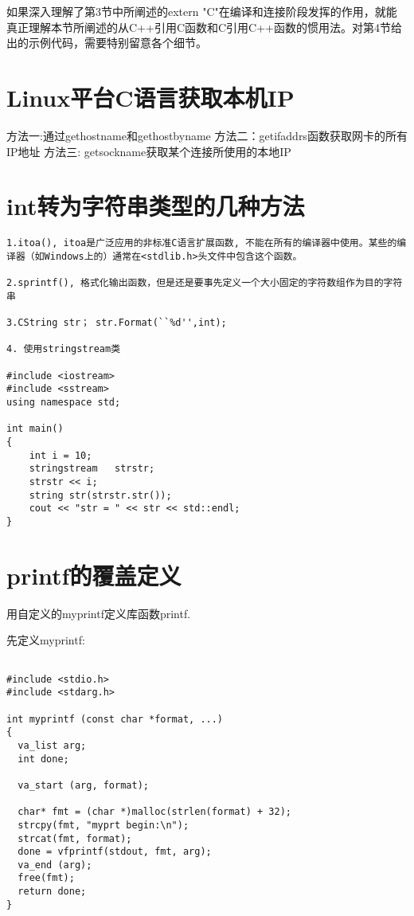 如果深入理解了第3节中所阐述的extern "C"在编译和连接阶段发挥的作用，就能真正理解本节所阐述的从C++引用C函数和C引用C++函数的惯用法。对第4节给出的示例代码，需要特别留意各个细节。 
\section{Linux平台C语言获取本机IP}
方法一:通过gethostname和gethostbyname
方法二：getifaddrs函数获取网卡的所有IP地址
方法三: getsockname获取某个连接所使用的本地IP

\section{int转为字符串类型的几种方法}
\begin{verbatim}
1.itoa(), itoa是广泛应用的非标准C语言扩展函数, 不能在所有的编译器中使用。某些的编译器（如Windows上的）通常在<stdlib.h>头文件中包含这个函数。

2.sprintf(), 格式化输出函数，但是还是要事先定义一个大小固定的字符数组作为目的字符串

3.CString str； str.Format(``%d'',int);

4. 使用stringstream类

#include <iostream> 
#include <sstream>   
using namespace std;

int main() 
{ 
	int i = 10;   
	stringstream   strstr;   
	strstr << i;   
	string str(strstr.str());   
	cout << "str = " << str << std::endl;   
}

\end{verbatim}

\section{printf的覆盖定义}

用自定义的myprintf定义库函数printf.

先定义myprintf:
\begin{verbatim}

#include <stdio.h>
#include <stdarg.h>

int myprintf (const char *format, ...)
{
  va_list arg;
  int done;
        
  va_start (arg, format);

  char* fmt = (char *)malloc(strlen(format) + 32);
  strcpy(fmt, "myprt begin:\n");
  strcat(fmt, format);
  done = vfprintf(stdout, fmt, arg);
  va_end (arg);
  free(fmt);
  return done;
}

\end{verbatim}

